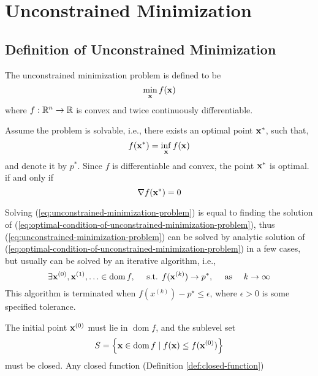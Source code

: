 \chapter{Unconstrained Minimization}

\section{Definition of Unconstrained Minimization}

\begin{definition}
	The unconstrained minimization problem is defined to be
	\begin{equation}
		\min_{{\bf x}}f({\bf x})
		\label{eq:unconstrained-minimization-problem}
	\end{equation}
	where $f:{\mathbb R}^n\rightarrow{\mathbb R}$ is convex and twice continuously differentiable.
\end{definition}

Assume the problem is solvable, i.e., there exists an optimal point ${\bf x}^{*}$, such that,
\begin{equation*}
	f({\bf x}^{*})=\inf_{{\bf x}}f({\bf x})
\end{equation*}
and denote it by $p^{*}$. Since $f$ is differentiable and convex, the point ${\bf x}^{*}$ is optimal. if and only if
\begin{equation}
	\nabla f({\bf x}^{*})=0
	\label{eq:optimal-condition-of-unconstrained-minimization-problem}
\end{equation}

Solving (\ref{eq:unconstrained-minimization-problem}) is equal to finding the solution of (\ref{eq:optimal-condition-of-unconstrained-minimization-problem}), thus (\ref{eq:unconstrained-minimization-problem}) can be solved by analytic solution of (\ref{eq:optimal-condition-of-unconstrained-minimization-problem}) in a few cases, but usually can be solved by an iterative algorithm, i.e.,
\begin{equation*}
	\exists{\bf x}^{(0)},{\bf x}^{(1)},\ldots\in\operatorname{dom}f,\quad\text{ s.t. }f({\bf x}^{(k)})\rightarrow p^{*},\quad\text{ as }\quad k\rightarrow\infty
\end{equation*}
This algorithm is terminated when $f\left(x^{(k)}\right)-p^{\star}\leq\epsilon$, where $\epsilon>0$ is some specified tolerance.

\begin{remark}
	The initial point ${\bf x}^{(0)}$ must lie in $\operatorname{dom}f$, and the sublevel set
	\begin{equation*}
		S=\left\{{\bf x}\in\operatorname{dom}f\mid f({\bf x})\leq f({\bf x}^{(0)})\right\}
	\end{equation*}
	must be closed. Any closed function (Definition \ref{def:closed-function})
\end{remark}

